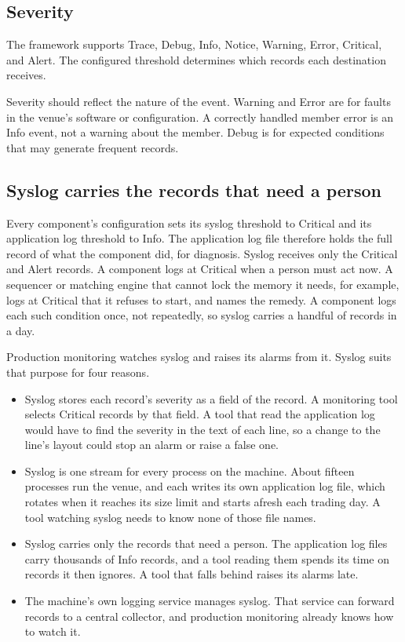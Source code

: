 \subsection{Severity}

The framework supports Trace, Debug, Info, Notice, Warning, Error, Critical,
and Alert. The configured threshold determines which records each destination
receives.

Severity should reflect the nature of the event. Warning and Error are for
faults in the venue's software or configuration. A correctly handled member
error is an Info event, not a warning about the member. Debug is for expected
conditions that may generate frequent records.

\subsection{Syslog carries the records that need a person}
\label{sec:syslog-for-alarms}

Every component's configuration sets its syslog threshold to Critical and its
application log threshold to Info. The application log file therefore holds
the full record of what the component did, for diagnosis. Syslog receives only
the Critical and Alert records. A component logs at Critical when a person must
act now. A sequencer or matching engine that cannot lock the memory it needs,
for example, logs at Critical that it refuses to start, and names the remedy. A
component logs each such condition once, not repeatedly, so syslog carries a
handful of records in a day.

Production monitoring watches syslog and raises its alarms from it. Syslog
suits that purpose for four reasons.

\begin{itemize}
  \item Syslog stores each record's severity as a field of the record. A
    monitoring tool selects Critical records by that field. A tool that read the
    application log would have to find the severity in the text of each line, so
    a change to the line's layout could stop an alarm or raise a false one.
  \item Syslog is one stream for every process on the machine. About fifteen
    processes run the venue, and each writes its own application log file, which
    rotates when it reaches its size limit and starts afresh each trading day. A
    tool watching syslog needs to know none of those file names.
  \item Syslog carries only the records that need a person. The application log
    files carry thousands of Info records, and a tool reading them spends its
    time on records it then ignores. A tool that falls behind raises its alarms
    late.
  \item The machine's own logging service manages syslog. That service can
    forward records to a central collector, and production monitoring already
    knows how to watch it.
\end{itemize}

